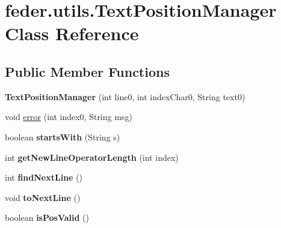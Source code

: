 \hypertarget{classfeder_1_1utils_1_1TextPositionManager}{}\section{feder.\+utils.\+Text\+Position\+Manager Class Reference}
\label{classfeder_1_1utils_1_1TextPositionManager}
\subsection*{Public Member Functions}
\begin{DoxyCompactItemize}
\item 
\mbox{\label{classfeder_1_1utils_1_1TextPositionManager_a0767c795cd2e17c8ebb8825a3c17fcdc}} 
{\bfseries Text\+Position\+Manager} (int line0, int index\+Char0, String text0)
\item 
void \hyperlink{classfeder_1_1utils_1_1TextPositionManager_a4fe9eadc4774d2a484055733b7a92427}{error} (int index0, String msg)
\item 
\mbox{\label{classfeder_1_1utils_1_1TextPositionManager_a4124c4f64724ba3a887d16a9b6a937cc}} 
boolean {\bfseries starts\+With} (String s)
\item 
\mbox{\label{classfeder_1_1utils_1_1TextPositionManager_a1ac90c2bbe24d0646bd6bd482b3410ea}} 
int {\bfseries get\+New\+Line\+Operator\+Length} (int index)
\item 
\mbox{\label{classfeder_1_1utils_1_1TextPositionManager_a169da111e4aaf19e468084b9bdf3f281}} 
int {\bfseries find\+Next\+Line} ()
\item 
\mbox{\label{classfeder_1_1utils_1_1TextPositionManager_ac41da5c279fab0f41f9affcd85f29a1e}} 
void {\bfseries to\+Next\+Line} ()
\item 
\mbox{\label{classfeder_1_1utils_1_1TextPositionManager_a403a1c0d10567b2aab84fe58f968841c}} 
boolean {\bfseries is\+Pos\+Valid} ()
\end{DoxyCompactItemize}
